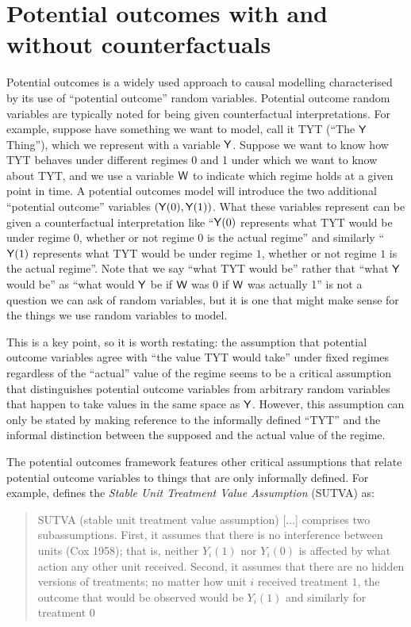 

\section{Potential outcomes with and without counterfactuals}\label{sec:potential_outcomes}

Potential outcomes is a widely used approach to causal modelling characterised by its use of ``potential outcome'' random variables. Potential outcome random variables are typically noted for being given counterfactual interpretations. For example, suppose have something we want to model, call it TYT (``The $\mathsf{Y}$ Thing''), which we represent with a variable $\mathsf{Y}$. Suppose we want to know how TYT behaves under different regimes 0 and 1 under which we want to know about TYT, and we use a variable $\mathsf{W}$ to indicate which regime holds at a given point in time. A potential outcomes model will introduce the two additional ``potential outcome'' variables $(\mathsf{Y}(0), \mathsf{Y}(1))$. What these variables represent can be given a counterfactual interpretation like ``$\mathsf{Y}(0)$ represents what TYT would be under regime $0$, whether or not regime $0$ is the actual regime'' and similarly ``$\mathsf{Y}(1)$ represents what TYT would be under regime $1$, whether or not regime $1$ is the actual regime''. Note that we say ``what TYT would be'' rather that ``what $\mathsf{Y}$ would be'' as ``what would $\mathsf{Y}$ be if $\mathsf{W}$ was 0 if $\mathsf{W}$ was actually 1'' is not a question we can ask of random variables, but it is one that might make sense for the things we use random variables to model.

This is a key point, so it is worth restating: the assumption that potential outcome variables agree with ``the value TYT would take'' under fixed regimes regardless of the ``actual'' value of the regime seems to be a critical assumption that distinguishes potential outcome variables from arbitrary random variables that happen to take values in the same space as $\mathsf{Y}$. However, this assumption can only be stated by making reference to the informally defined ``TYT'' and the informal distinction between the supposed and the actual value of the regime.

The potential outcomes framework features other critical assumptions that relate potential outcome variables to things that are only informally defined. For example, \citet{rubin_causal_2005} defines the \emph{Stable Unit Treatment Value Assumption} (SUTVA) as:

\begin{quote}
SUTVA (stable unit treatment value assumption) [...] comprises two subassumptions. First, it assumes that there is no interference between units (Cox 1958); that is, neither $Y_i(1)$ nor $Y_i(0)$ is affected by what action any other unit received. Second, it assumes that there are no hidden versions of treatments; no matter how unit $i$ received treatment $1$, the outcome that would be observed would be $Y_i(1)$ and similarly for treatment $0$
\end{quote}

